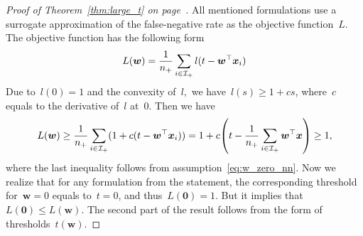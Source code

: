 \larget*
\begin{proof}[Proof of Theorem~\ref{thm:large_t} on page~\pageref{thm:large_t}]
  All mentioned formulations use a surrogate approximation of the false-negative rate as the objective function~$L.$ The objective function has the following form
  \begin{equation*}
    L(\bm{w})
      = \frac{1}{n_{+}}\sum_{i \in \mathcal{I}_{+}}l(t - \bm{w}^{\top} \bm{x}_i)
  \end{equation*}
  Due to~$l(0) = 1$ and the convexity of~$l,$ we have~$l(s) \geq 1 + cs$, where~$c$ equals to the derivative of~$l$ at~$0$. Then we have
  \begin{equation*}
    L(\bm{w}) 
      \geq \frac{1}{\npos} \sum_{i \in \Ipos}(1 + c(t-\bm{w}^{\top} \bm{x}_i))
      = 1 + c\Brac{t - \frac{1}{\npos}\sum_{i \in \Ipos}\bm{w}^{\top} \bm{x}}
      \geq 1,
  \end{equation*}
  where the last inequality follows from assumption~\eqref{eq:w_zero_nn}. Now we realize that for any formulation from the statement, the corresponding threshold for~$\bm{w}=0$ equals to~$t=0$, and thus~$L(\bm{0})=1$. But it implies that~$L(\bm{0}) \leq L(\bm{w})$. The second part of the result follows from the form of thresholds~$t(\bm{w})$.
\end{proof}


